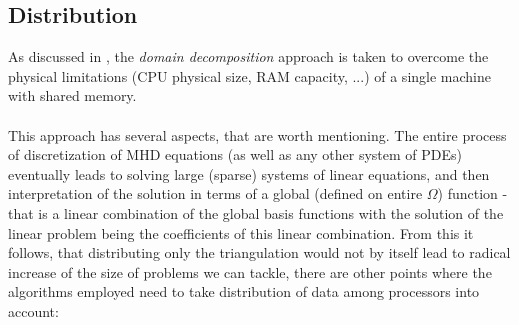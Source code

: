 \subsection{Distribution}
As discussed in , the \textit{domain decomposition} approach is taken to overcome the physical limitations (CPU physical size, RAM capacity, ...) of a single machine with shared memory.
\paragraph{}
This approach has several aspects, that are worth mentioning. The entire process of discretization of MHD equations (as well as any other system of PDEs) eventually leads to solving large (sparse) systems of linear equations, and then interpretation of the solution in terms of a global (defined on entire $\Omega$) function - that is a linear combination of the global basis functions with the solution of the linear problem being the coefficients of this linear combination. From this it follows, that distributing only the triangulation would not by itself lead to radical increase of the size of problems we can tackle, there are other points where the algorithms employed need to take distribution of data among processors into account:
